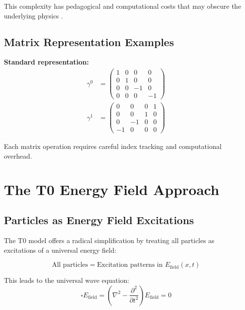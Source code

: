 \documentclass[12pt,a4paper]{report}
\begin{document}
This complexity has pedagogical and computational costs that may obscure the underlying physics \cite{weinberg_qft_1995}.

\subsection{Matrix Representation Examples}
\label{subsec:matrix_examples}

\textbf{Standard representation:}
\begin{align}
	\gamma^0 &= \begin{pmatrix} 1 & 0 & 0 & 0 \\ 0 & 1 & 0 & 0 \\ 0 & 0 & -1 & 0 \\ 0 & 0 & 0 & -1 \end{pmatrix} \\
	\gamma^1 &= \begin{pmatrix} 0 & 0 & 0 & 1 \\ 0 & 0 & 1 & 0 \\ 0 & -1 & 0 & 0 \\ -1 & 0 & 0 & 0 \end{pmatrix}
\end{align}

Each matrix operation requires careful index tracking and computational overhead.

\section{The T0 Energy Field Approach}
\label{sec:t0_energy_approach}

\subsection{Particles as Energy Field Excitations}
\label{subsec:energy_field_excitations}

The T0 model offers a radical simplification by treating all particles as excitations of a universal energy field:

\begin{equation}
	\boxed{\text{All particles} = \text{Excitation patterns in } E_{\text{field}}(x,t)}
\end{equation}

This leads to the universal wave equation:
\begin{equation}
	\boxed{\square E_{\text{field}} = \left(\nabla^2 - \frac{\partial^2}{\partial t^2}\right) E_{\text{field}} = 0}
	\label{eq:universal_wave_equation}
\end{equation}
\end{document}

